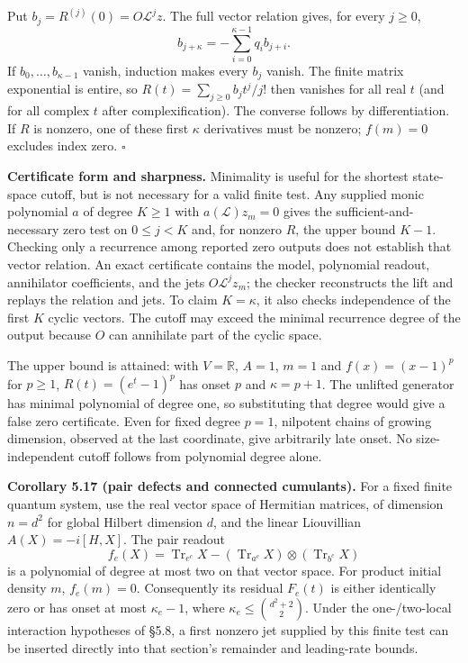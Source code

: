 \documentclass[
  11pt,
]{article}
\begin{document}
Put \(b_j=R^{(j)}(0)=O\mathcal L^jz\). The full vector relation gives, for
every \(j\geq0\),
\[
 b_{j+\kappa}=-\sum_{i=0}^{\kappa-1}q_i b_{j+i}.
\]
If \(b_0,\ldots,b_{\kappa-1}\) vanish, induction makes every \(b_j\) vanish.
The finite matrix exponential is entire, so
\(R(t)=\sum_{j\geq0}b_jt^j/j!\) then vanishes for all real \(t\) (and for all
complex \(t\) after complexification). The converse follows by differentiation.
If \(R\) is nonzero, one of these first \(\kappa\) derivatives must be nonzero;
\(f(m)=0\) excludes index zero. \(\square\)

\textbf{Certificate form and sharpness.} Minimality is useful for the shortest
state-space cutoff, but is not necessary for a valid finite test. Any supplied
monic polynomial \(a\) of degree \(K\geq1\) with \(a(\mathcal L)z_m=0\) gives
the sufficient-and-necessary zero test on \(0\leq j<K\) and, for nonzero \(R\),
the upper bound \(K-1\). Checking only a recurrence among reported zero outputs
does not establish that vector relation. An exact certificate contains the
model, polynomial readout, annihilator coefficients, and the jets
\(O\mathcal L^jz_m\); the checker reconstructs the lift and replays the
relation and jets. To claim \(K=\kappa\), it also checks independence of the
first \(K\) cyclic vectors. The cutoff may exceed the minimal recurrence degree
of the output because \(O\) can annihilate part of the cyclic space.

The upper bound is attained: with \(V=\mathbb R\), \(A=1\), \(m=1\) and
\(f(x)=(x-1)^p\) for \(p\geq1\), \(R(t)=(e^t-1)^p\) has onset \(p\) and
\(\kappa=p+1\). The unlifted generator has minimal polynomial of degree one,
so substituting that degree would give a false zero certificate. Even for
fixed degree \(p=1\), nilpotent chains of growing dimension, observed at the
last coordinate, give arbitrarily late onset. No size-independent cutoff
follows from polynomial degree alone.

\textbf{Corollary 5.17 (pair defects and connected cumulants).} For a fixed finite
quantum system, use the real vector space of Hermitian matrices, of dimension
\(n=d^2\) for global Hilbert dimension \(d\), and the linear Liouvillian
\(A(X)=-i[H,X]\). The pair readout
\[
 f_e(X)=\operatorname{Tr}_{e^c}X
       -(\operatorname{Tr}_{a^c}X)\otimes(\operatorname{Tr}_{b^c}X)
\]
is a polynomial of degree at most two on that vector space. For product
initial density \(m\), \(f_e(m)=0\). Consequently its residual \(F_e(t)\) is either
identically zero or has onset at most \(\kappa_e-1\), where
\(\kappa_e\leq {d^2+2\choose2}\). Under the one-/two-local interaction
hypotheses of §5.8, a first nonzero jet supplied by this finite test can be
inserted directly into that section's remainder and leading-rate bounds.
\end{document}
